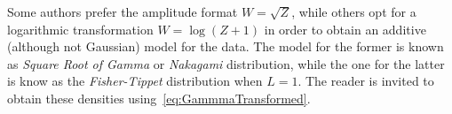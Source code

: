 Some authors\cite{IterativeWeightedMaximumLikelihoodDenoising} prefer the amplitude format $W=\sqrt{Z}$, while others\cite{Santos2017} opt for a logarithmic transformation $W=\log(Z+1)$ in order to obtain an additive (although not Gaussian) model for the data.
The model for the former is known as \textit{Square Root of Gamma} or \textit{Nakagami} distribution,
while the one for the latter is know as the \textit{Fisher-Tippet} distribution when $L=1$.
The reader is invited to obtain these densities using~\eqref{eq:GammmaTransformed}.